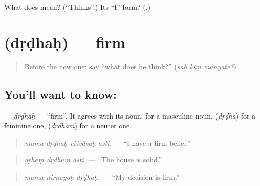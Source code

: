 \begin{tcolorbox}[breakable,colback=teal!4,colframe=teal!35!black,title={Before you move on}]
What does \textbf{} mean? (\textquotedblleft{}Thinks\textquotedblright{}.) Its \textquotedblleft{}I\textquotedblright{} form? (\textbf{}.)
\end{tcolorbox}
\section[\texorpdfstring{\sk{दृढः} (dṛḍhaḥ)}{दृढः (dṛḍhaḥ)}]{ (dṛḍhaḥ) — firm}

\label{lesson:SA-C278-drdhah}



\begin{quote}
Before the new one: say \textquotedblleft{}what does he think?\textquotedblright{} (\emph{saḥ kiṃ manyate?})
\end{quote}

\subsection*{You'll want to know: }
\textbf{} — \emph{dṛḍhaḥ} — \textquotedblleft{}firm\textquotedblright{}. It agrees with its noun: \textbf{} for a masculine noun, \textbf{} (\emph{dṛḍhā}) for a feminine one, \textbf{} (\emph{dṛḍham}) for a neuter one.

\begin{quote}
\textbf{   }
\end{quote}

\begin{quote}
\emph{mama dṛḍhaḥ viśvāsaḥ asti.} — \textquotedblleft{}I have a firm belief.\textquotedblright{}
\end{quote}

\begin{quote}
\textbf{  }
\end{quote}

\begin{quote}
\emph{gṛhaṃ dṛḍham asti.} — \textquotedblleft{}The house is solid.\textquotedblright{}
\end{quote}

\begin{quote}
\textbf{  }
\end{quote}

\begin{quote}
\emph{mama nirṇayaḥ dṛḍhaḥ.} — \textquotedblleft{}My decision is firm.\textquotedblright{}
\end{quote}


